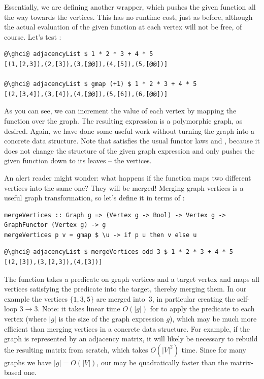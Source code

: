 Essentially, we are defining another  wrapper, which pushes the
given function all the way towards the vertices. This has no runtime cost,
just as before, although the actual evaluation of the given function at each
vertex will not be free, of course. Let's test :

\begin{verbatim}
@\ghci@ adjacencyList $ 1 * 2 * 3 + 4 * 5
[(1,[2,3]),(2,[3]),(3,[@@]),(4,[5]),(5,[@@])]

@\ghci@ adjacencyList $ gmap (+1) $ 1 * 2 * 3 + 4 * 5
[(2,[3,4]),(3,[4]),(4,[@@]),(5,[6]),(6,[@@])]
\end{verbatim}
\vspace{-1mm}
As you can see, we can increment the value of each vertex by mapping the function
 over the graph. The resulting expression is a polymorphic graph, as desired.
Again, we have done some useful work without turning the graph into a concrete data
structure. Note that  satisfies the usual functor laws
 and , because
it does not change the structure of the given graph expression and only pushes
the given function down to its leaves -- the vertices.

An alert reader might wonder: what happens if the function maps two different
vertices into the same one? They will be merged! Merging graph vertices is
a useful graph transformation, so let's define it in terms of :

\begin{verbatim}
mergeVertices :: Graph g => (Vertex g -> Bool) -> Vertex g -> GraphFunctor (Vertex g) -> g
mergeVertices p v = gmap $ \u -> if p u then v else u
\end{verbatim}
\vspace{-1mm}
\begin{verbatim}
@\ghci@ adjacencyList $ mergeVertices odd 3 $ 1 * 2 * 3 + 4 * 5
[(2,[3]),(3,[2,3]),(4,[3])]
\end{verbatim}
\vspace{-1mm}
The function takes a predicate on graph vertices and a target vertex and
maps all vertices satisfying the predicate into the target, thereby
merging them. In our example the  vertices $\{1, 3, 5\}$ are merged
into~3, in particular creating the self-loop $3 \rightarrow 3$. Note: it takes
linear time $O(|g|)$ for  to apply the predicate to each vertex
(where $|g|$ is the size of the graph expression $g$), which may be much more efficient
than merging vertices in a concrete data structure. For example, if the graph
is represented by an adjacency matrix, it will likely be necessary to rebuild
the resulting matrix from scratch, which takes $O(|V|^2)$ time. Since for
many graphs we have $|g| = O(|V|)$, our 
may be quadratically faster than the matrix-based one.


